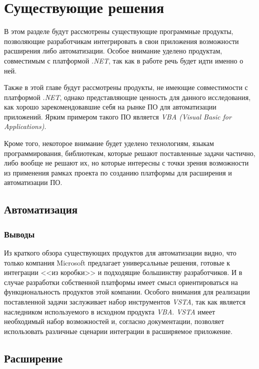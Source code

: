 \section{Существующие решения}

В этом разделе будут рассмотрены существующие программные продукты, позволяющие разработчикам интегрировать в свои приложения возможности расширения либо автоматизации. Особое внимание уделено продуктам, совместимым с платформой {\it .NET}, так как в работе речь будет идти именно о ней.

Также в этой главе будут рассмотрены продукты, не имеющие совместимости с платформой {\it .NET}, однако представляющие ценность для данного исследования, как хорошо зарекомендовавшие себя на рынке ПО для автоматизации приложений. Ярким примером такого ПО является {\it VBA (Visual Basic for Applications)}.

Кроме того, некоторое внимание будет уделено технологиям, языкам программирования, библиотекам, которые решают поставленные задачи частично, либо вообще не решают их, но которые интересны с точки зрения возможности из применения рамках проекта по созданию платформы для расширения и автоматизации ПО.

\subsection{Автоматизация}







\subsubsection{Выводы}

Из краткого обзора существующих продуктов для автоматизации видно, что только компания Microsoft предлагает универсальные решения, готовые к интеграции <<из коробки>> и подходящие большинству разработчиков. И в случае разработки собственной платформы имеет смысл ориентироваться на функциональность продуктов этой компании. Особого внимания для реализации поставленной задачи заслуживает набор инструментов {\it VSTA}, так как является наследником используемого в исходном продукта {\it VBA}. {\it VSTA} имеет необходимый набор возможностей и, согласно документации, позволяет использовать различные сценарии интеграции в расширяемое приложение.

\subsection{Расширение}

